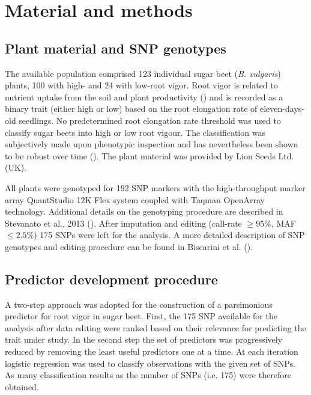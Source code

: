 \section{Material and methods}

\subsection{Plant material and SNP genotypes}
\label{sec:data}
The available population comprised 123 individual sugar beet (\emph{B. vulgaris})
plants, 100 with high- and 24 with low-root vigor. Root vigor is related
to nutrient uptake from the soil and plant productivity
(\cite{stevanato2010root}) and is recorded as a binary trait (either
high or low) based on the root elongation
rate of eleven-days-old seedlings. No predetermined root
elongation rate threshold was used to classify sugar beets into high or low
root vigour. The classification was subjectively made upon phenotypic
inspection and has nevertheless been shown to be robust over time (\cite{stevanato2010root}). 
The plant material was provided by Lion Seeds Ltd. (UK).

All plants were genotyped for 192 SNP markers with the
high-throughput marker array QuantStudio 12K Flex system
coupled with Taqman OpenArray technology. Additional details on the
genotyping procedure are described in Stevanato et al., 2013 (\cite{stevanato2013high}).
After imputation and editing (call-rate $\geq 95\%$, MAF $\leq 2.5\%$)
175 SNPs were left for the analysis. A more detailed description of SNP
genotypes and editing procedure can be found in Biscarini et al. (\cite{biscarini2014genome}).

\subsection{Predictor development procedure}
\label{sec:overview}
A two-step approach was adopted for the construction of a parsimonious
predictor for root vigor in sugar beet.
First, the 175 SNP available for the analysis after data editing were ranked based on their
relevance for predicting the trait under study.
In the second step the set of predictors was progressively reduced by
removing the least useful predictors one at a time. At each iteration
logistic regression was used to classify observations with the given set
of SNPs. 
As many classification results as the number of SNPs (i.e. 175) were
therefore obtained.

